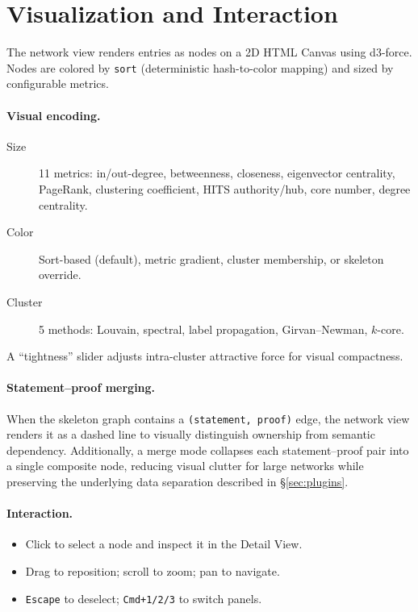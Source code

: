 \section{Visualization and Interaction}
\label{sec:visualization}

The network view renders entries as nodes on a 2D HTML Canvas using d3-force. Nodes are colored by \texttt{sort} (deterministic hash-to-color mapping) and sized by configurable metrics.

\paragraph{Visual encoding.}

\begin{description}
  \item[Size] 11 metrics: in/out-degree, betweenness, closeness, eigenvector centrality, PageRank, clustering coefficient, HITS authority/hub, core number, degree centrality.
  \item[Color] Sort-based (default), metric gradient, cluster membership, or skeleton override.
  \item[Cluster] 5 methods: Louvain, spectral, label propagation, Girvan--Newman, $k$-core.
\end{description}

A ``tightness'' slider adjusts intra-cluster attractive force for visual compactness.

\paragraph{Statement--proof merging.}
When the skeleton graph contains a \texttt{(statement, proof)} edge, the network view renders it as a dashed line to visually distinguish ownership from semantic dependency. Additionally, a merge mode collapses each statement--proof pair into a single composite node, reducing visual clutter for large networks while preserving the underlying data separation described in \S\ref{sec:plugins}.

\paragraph{Interaction.}

\begin{itemize}
  \item Click to select a node and inspect it in the Detail View.
  \item Drag to reposition; scroll to zoom; pan to navigate.
  \item \texttt{Escape} to deselect; \texttt{Cmd+1/2/3} to switch panels.
\end{itemize}

